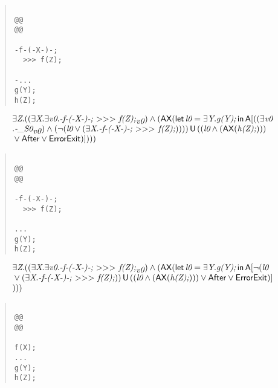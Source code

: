\documentclass{article}
\newcommand{\U}{\,\mbox{\sf{U}}\,}
\newcommand{\A}{\mbox{\sf{A}}}
\newcommand{\AX}{\mbox{\sf{AX}}}
\newcommand{\mita}[1]{\mbox{\it{{#1}}}}
\newcommand{\msf}[1]{\mbox{\sf{{#1}}}}
\newcommand{\mth}[1]{\({#1}\)}
\begin{document}
\begin{quote}\begin{verbatim}

@@
@@

-f-(-X-)-;
  >>> f(Z);

-...
g(Y);
h(Z);
\end{verbatim}\end{quote}

\[\begin{array}{l}
\exists \mita{Z} . ((\exists \mita{X} . \exists \mita{v0} . \mita{-f-(-X-)-;
  \mth{>}\mth{>}\mth{>} f(Z);}_{\mita{v0}}) \wedge (\AX(\mita{\sf{let}} \, \mita{l0} = \exists \mita{Y} . \mita{g(Y);} \, \mita{\sf{in}} \, \A[((\exists \mita{v0}\\\mbox{} . \mita{-\_S0}_{\mita{v0}}) \wedge (\neg (\mita{l0} \vee (\exists \mita{X} . \mita{-f-(-X-)-;
  \mth{>}\mth{>}\mth{>} f(Z);})))) \U ((\mita{l0} \wedge (\AX(\mita{h(Z);})))\\\mbox{} \vee \msf{After} \vee \msf{ErrorExit})]

)))
\end{array}\]

\begin{quote}\begin{verbatim}

@@
@@

-f-(-X-)-;
  >>> f(Z);

...
g(Y);
h(Z);
\end{verbatim}\end{quote}

\[\begin{array}{l}
\exists \mita{Z} . ((\exists \mita{X} . \exists \mita{v0} . \mita{-f-(-X-)-;
  \mth{>}\mth{>}\mth{>} f(Z);}_{\mita{v0}}) \wedge (\AX(\mita{\sf{let}} \, \mita{l0} = \exists \mita{Y} . \mita{g(Y);} \, \mita{\sf{in}} \, \A[\neg (\mita{l0}\\\mbox{} \vee (\exists \mita{X} . \mita{-f-(-X-)-;
  \mth{>}\mth{>}\mth{>} f(Z);})) \U ((\mita{l0} \wedge (\AX(\mita{h(Z);}))) \vee \msf{After} \vee \msf{ErrorExit})]
\\\mbox{}
)))
\end{array}\]

\begin{quote}\begin{verbatim}

@@
@@

f(X);
...
g(Y);
h(Z);
\end{verbatim}\end{quote}
\end{document}
